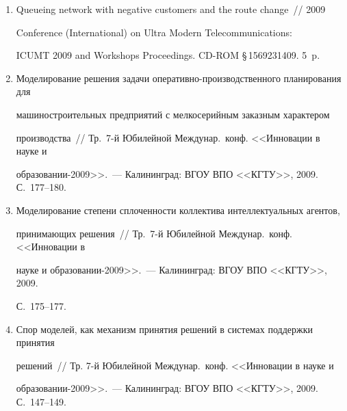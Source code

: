 \begin{enumerate}[1.]
V~Междунар.\ науч.-практич.\ конф. <<Интегрированные модели и мягкие 


вычисления в искусственном интеллекте>>.~--- М.: Физ\-мат\-лит, 2009. Т.~1. С.~324--333.





\item {}


Queueing network with negative customers and the route change~// 2009 


Conference (International) on Ultra Modern Telecommunications: 


ICUMT 2009 and Workshops Proceedings. CD-ROM \S\,1569231409. 5~p.





\item {}


Моделирование решения задачи оперативно-производственного планирования для 


машиностроительных предприятий с мелкосерийным заказным характером 


производства~// Тр.\ 7-й Юбилейной Междунар.\ конф. <<Инновации в науке и 


образовании-2009>>.~--- Калининград:  ВГОУ ВПО <<КГТУ>>, 2009. С.~177--180.





\item {}


Моделирование степени сплоченности коллектива интеллектуальных агентов, 


принимающих решения~// Тр.\ 7-й Юбилейной Междунар.\ конф. <<Инновации в 


науке и образовании-2009>>.~--- Калининград:  ВГОУ ВПО <<КГТУ>>, 2009. 


С.~175--177.





\item {}


Спор моделей, как механизм принятия решений в системах поддержки принятия 


решений~// Тр. 7-й Юбилейной Междунар.\ конф. <<Инновации в науке и 


образовании-2009>>.~--- Калининград:  ВГОУ ВПО <<КГТУ>>, 2009. С.~147--149.






\end{enumerate}
